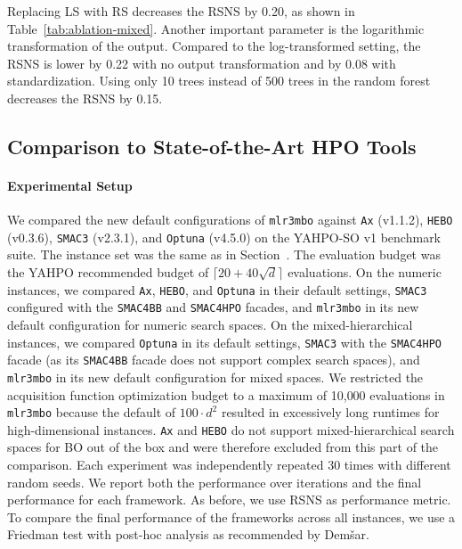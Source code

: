 \documentclass[12pt,letterpaper]{article}
\begin{document}
Replacing LS with RS decreases the RSNS by 0.20, as shown in Table~\ref{tab:ablation-mixed}.
Another important parameter is the logarithmic transformation of the output.
Compared to the log-transformed setting, the RSNS is lower by 0.22 with no output transformation and by 0.08 with standardization.
Using only 10 trees instead of 500 trees in the random forest decreases the RSNS by 0.15.

\subsection*{Comparison to State-of-the-Art HPO Tools}
\label{sec:performance-comparison}

\paragraph{Experimental Setup}

We compared the new default configurations of \texttt{mlr3mbo} against \texttt{Ax} (v1.1.2)\cite{olson2025}, \texttt{HEBO} (v0.3.6)\cite{cowen-rivers2022}, \texttt{SMAC3} (v2.3.1)\cite{lindauer2022}, and \texttt{Optuna} (v4.5.0)\cite{akiba2019} on the YAHPO-SO v1 benchmark suite.
The instance set was the same as in Section~.
The evaluation budget was the YAHPO recommended budget of $\lceil 20 + 40 \sqrt{d} \rceil$ evaluations.
On the numeric instances, we compared \texttt{Ax}, \texttt{HEBO}, and \texttt{Optuna} in their default settings, \texttt{SMAC3} configured with the \texttt{SMAC4BB} and \texttt{SMAC4HPO} facades, and \texttt{mlr3mbo} in its new default configuration for numeric search spaces.
On the mixed-hierarchical instances, we compared \texttt{Optuna} in its default settings, \texttt{SMAC3} with the \texttt{SMAC4HPO} facade (as its \texttt{SMAC4BB} facade does not support complex search spaces), and \texttt{mlr3mbo} in its new default configuration for mixed spaces.
We restricted the acquisition function optimization budget to a maximum of 10{,}000 evaluations in \texttt{mlr3mbo} because the default of $100 \cdot d^2$ resulted in excessively long runtimes for high-dimensional instances.
\texttt{Ax} and \texttt{HEBO} do not support mixed-hierarchical search spaces for BO out of the box and were therefore excluded from this part of the comparison.
Each experiment was independently repeated 30 times with different random seeds.
We report both the performance over iterations and the final performance for each framework.
As before, we use RSNS as performance metric.
To compare the final performance of the frameworks across all instances, we use a Friedman test with post-hoc analysis as 
recommended by Demšar\cite{demsar2006}. 
\end{document}
